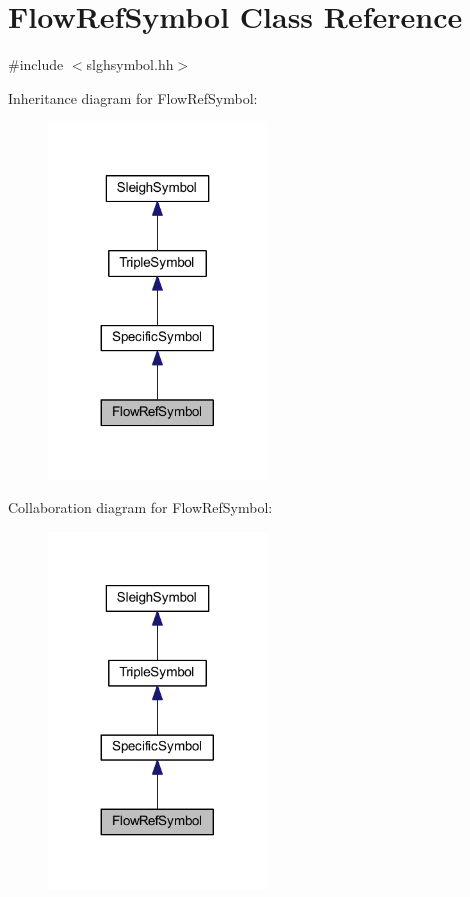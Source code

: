 \hypertarget{class_flow_ref_symbol}{}\section{Flow\+Ref\+Symbol Class Reference}
\label{class_flow_ref_symbol}


{\ttfamily \#include $<$slghsymbol.\+hh$>$}



Inheritance diagram for Flow\+Ref\+Symbol\+:
\nopagebreak
\begin{figure}[H]
\begin{center}
\leavevmode
\includegraphics[width=164pt]{class_flow_ref_symbol__inherit__graph}
\end{center}
\end{figure}


Collaboration diagram for Flow\+Ref\+Symbol\+:
\nopagebreak
\begin{figure}[H]
\begin{center}
\leavevmode
\includegraphics[width=164pt]{class_flow_ref_symbol__coll__graph}
\end{center}
\end{figure}
